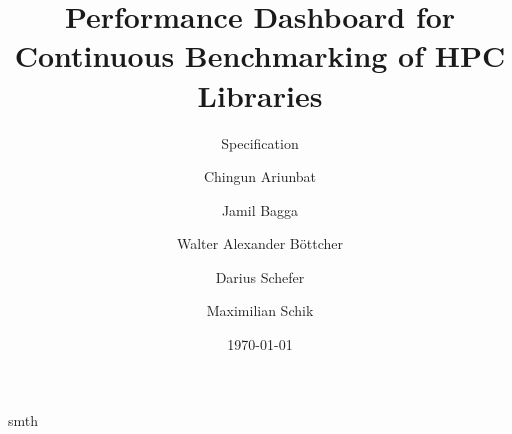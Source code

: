 \documentclass{beamer}
\title{Performance Dashboard for Continuous Benchmarking of HPC Libraries}
\subtitle{Specification}
\author{Chingun Ariunbat \and Jamil Bagga \and Walter Alexander Böttcher \and Darius Schefer \and Maximilian Schik}
\date{\today}
\begin{document}
\begin{frame}
    \titlepage
\end{frame}

\begin{frame}
    smth
\end{frame}
\end{document}
